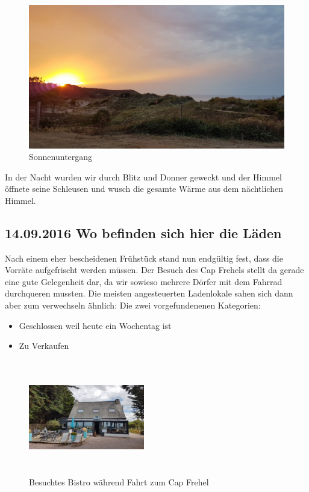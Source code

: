 \begin{figure}[H]
    \centering
    \includegraphics[width=\textwidth]{../Bilder/Bretagne/108.jpg}
    \caption{Sonnenuntergang}
    \label{img:Sonnenuntergang}
\end{figure}

In der Nacht wurden wir durch Blitz und Donner geweckt und der Himmel öffnete seine Schleusen und wusch die gesamte Wärme aus dem nächtlichen Himmel.


\subsection{14.09.2016 Wo befinden sich hier die Läden}
Nach einem eher bescheidenen Frühstück stand nun endgültig fest, dass die Vorräte aufgefrischt werden müssen.
Der Besuch des Cap Frehels stellt da gerade eine gute Gelegenheit dar, da wir sowieso mehrere Dörfer mit dem Fahrrad durchqueren mussten.
Die meisten angesteuerten Ladenlokale sahen sich dann aber zum verwechseln ähnlich:
Die zwei vorgefundenenen Kategorien:

\begin{itemize}
    \item Geschlossen weil heute ein Wochentag ist
    \item Zu Verkaufen
\end{itemize}

\begin{figure} 
  \begin{centering}
    \includegraphics[width=0.45\textwidth, height=5cm, keepaspectratio]{../Bilder/Bretagne/111.jpg}
    \caption{Besuchtes Bistro während Fahrt zum Cap Frehel}
  \end{centering}
\end{figure} 

